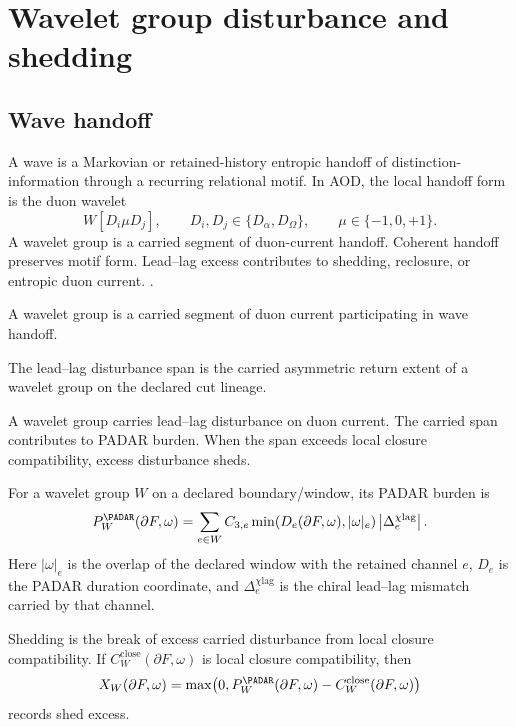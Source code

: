 \section{Wavelet group disturbance and shedding}\label{sec:wavelet-group-disturbance}

\subsection*{Wave handoff}
A wave is a Markovian or retained-history entropic handoff of distinction-information through a recurring relational motif. In AOD, the local handoff form is the duon wavelet
\[
W[D_i\mu D_j],
\qquad
D_i,D_j\in\{D_\alpha,D_\Omega\},
\qquad
\mu\in\{-1,0,+1\}.
\]
A wavelet group is a carried segment of duon-current handoff. Coherent handoff preserves motif form. Lead--lag excess contributes to shedding, reclosure, or entropic duon current. .

\begin{definition}
A wavelet group is a carried segment of duon current participating in wave handoff.
\end{definition}

\begin{definition}
The lead--lag disturbance span is the carried asymmetric return extent of a wavelet group on the declared cut lineage.
\end{definition}

A wavelet group carries lead--lag disturbance on duon current. The carried span contributes to PADAR burden. When the span exceeds local closure compatibility, excess disturbance sheds.

\begin{definition}
For a wavelet group \(W\) on a declared boundary/window, its PADAR burden is
\[
P^{\PADAR}_{W}(\partial F,\omega)=
\sum_{e\in W}
C_{3,e}
\min\!\left(D_e(\partial F,\omega),|\omega|_e\right)
\left|\Delta^{\chi\mathrm{lag}}_e\right|.
\]
Here \(|\omega|_e\) is the overlap of the declared window with the retained channel \(e\), \(D_e\) is the PADAR duration coordinate, and \(\Delta^{\chi\mathrm{lag}}_e\) is the chiral lead--lag mismatch carried by that channel.
\end{definition}

\begin{definition}[Shedding]
Shedding is the break of excess carried disturbance from local closure compatibility. If \(C^{\mathrm{close}}_W(\partial F,\omega)\) is local closure compatibility, then
\[
X_W(\partial F,\omega)=
\max\!\left(0,
P^{\PADAR}_{W}(\partial F,\omega)-C^{\mathrm{close}}_W(\partial F,\omega)
\right)
\]
records shed excess.
\end{definition}

